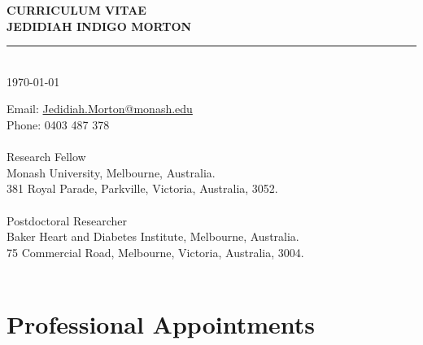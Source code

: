 \documentclass[11pt]{article}
\newcommand{\thedate}{\today}
\begin{document}
\begin{titlepage}
    \begin{center}
        \Huge
        \textbf{CURRICULUM VITAE \\
JEDIDIAH INDIGO MORTON}
\rule{16cm}{2mm} \\
\Large
\thedate \\
       \vfill
    \end{center}
        \Large

\noindent
Email: \color{blue}
 \href{mailto:Jedidiah.Morton@Monash.edu}{Jedidiah.Morton@monash.edu} \\
\color{black}
Phone: \color{blue} 0403 487 378 \\
\color{black}
 \\
Research Fellow \\
Monash University, Melbourne, Australia. \\
381 Royal Parade, Parkville, Victoria, Australia, 3052. \\
 \\
Postdoctoral Researcher \\
Baker Heart and Diabetes Institute, Melbourne, Australia. \\
75 Commercial Road, Melbourne, Victoria, Australia, 3004. \\
\\
\end{titlepage}

\tableofcontents


\color{white}
\cite{DMLDE2024,
DMMJA2024,
TanAJE2024,
DinaEJPC2024,
MortonVIH2024,
MehtaDRCP2024,
LivoriHLC2024,
FelekeDC2024,
ZiserBJCP2024,
ZiserJD2024,
AbebeNeur2024,
AbebeNeu2024,
DoodyAGG2024,
MacPE2024,
MortonDRCP2024,
TanCPT2024,
tanDRCP2024,
LivoriIJC2024,
LivoriEJPC2023,
MacCO2024,
FelekeDRCP2023,
LordPPT2023,
AbebeEHJ2023,
MortonPECA2023,
MortonAJKD2023,
DoodyAGG2023,
MacCirc2023,
DinaPE2023,
LloydDLOGIA2023,
MortonVIH2023,
TomicDRCP2023,
LazzDLOGIA2023,
QuigleyDRCP2022,
MacVIH2022,
MortonDLOGIA2023,
TomicDRCP2022,
TomicLDE2022,
MortonEJPC2023,
AdemiPE2022,
MortonDRCP2022,
MortonDM2022b,
MortonJECH2022,
OyunTAEM2022,
RuizDLOGIA2022,
MortonDC2022,
MortonJONS2022,
HastingsPE2022,
MortonDM2022a,
HardingNDT2022,
OyunSR2021,
MortonDC2021,
MortonDLOGIA2021,
MortonDC2020}
\color{black}
\pagebreak


\section*{Professional Appointments}
\end{document}
